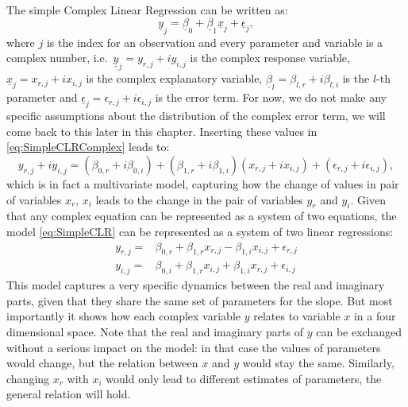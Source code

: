\documentclass[
]{book}
\begin{document}
The simple Complex Linear Regression can be written as:
\begin{equation}
    \underline{y}_j = \underline{\beta}_0 + \underline{\beta}_1 \underline{x}_j + \underline{\epsilon}_j,
    \label{eq:SimpleCLRComplex}
\end{equation}
where \(j\) is the index for an observation and every parameter and variable is a complex number, i.e.~\(\underline{y}_j = y_{r,j}+i y_{i,j}\) is the complex response variable, \(\underline{x}_j = x_{r,j}+i x_{i,j}\) is the complex explanatory variable, \(\underline{\beta}_{l} = \beta_{l,r} + i \beta_{l,i}\) is the \(l\)-th parameter and \(\underline{\epsilon}_j = \epsilon_{r,j} + i \epsilon_{i,j}\) is the error term. For now, we do not make any specific assumptions about the distribution of the complex error term, we will come back to this later in this chapter. Inserting these values in \eqref{eq:SimpleCLRComplex} leads to:
\begin{equation}
    y_{r,j}+i y_{i,j} = (\beta_{0,r} + i \beta_{0,i}) + (\beta_{1,r} + i \beta_{1,i}) (x_{r,j}+i x_{i,j}) + (\epsilon_{r,j} + i \epsilon_{i,j}),
    \label{eq:SimpleCLR}
\end{equation}
which is in fact a multivariate model, capturing how the change of values in pair of variables \(x_r\), \(x_i\) leads to the change in the pair of variables \(y_r\) and \(y_i\). Given that any complex equation can be represented as a system of two equations, the model \eqref{eq:SimpleCLR} can be represented as a system of two linear regressions:
\begin{equation}
    \begin{aligned}
        y_{r,j} = & \beta_{0,r} + \beta_{1,r} x_{r,j} - \beta_{1,i} x_{i,j} + \epsilon_{r,j} \\
        y_{i,j} = & \beta_{0,i} + \beta_{1,r} x_{i,j} + \beta_{1,i} x_{r,j} + \epsilon_{i,j}
    \end{aligned}
    \label{eq:SimpleCLRSystem}
\end{equation}
This model captures a very specific dynamics between the real and imaginary parts, given that they share the same set of parameters for the slope. But most importantly it shows how each complex variable \(y\) relates to variable \(x\) in a four dimensional space. Note that the real and imaginary parts of \(y\) can be exchanged without a serious impact on the model: in that case the values of parameters would change, but the relation between \(x\) and \(y\) would stay the same. Similarly, changing \(x_r\) with \(x_i\) would only lead to different estimates of parameters, the general relation will hold.
\end{document}

